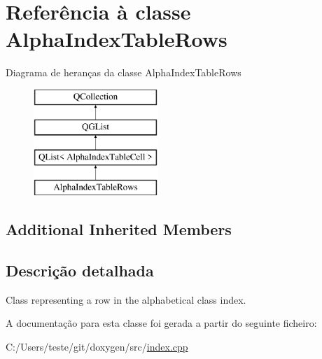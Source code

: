 \hypertarget{class_alpha_index_table_rows}{\section{Referência à classe Alpha\-Index\-Table\-Rows}
\label{class_alpha_index_table_rows}
}
Diagrama de heranças da classe Alpha\-Index\-Table\-Rows\begin{figure}[H]
\begin{center}
\leavevmode
\includegraphics[height=4.000000cm]{class_alpha_index_table_rows}
\end{center}
\end{figure}
\subsection*{Additional Inherited Members}


\subsection{Descrição detalhada}
Class representing a row in the alphabetical class index. 

A documentação para esta classe foi gerada a partir do seguinte ficheiro\-:\begin{DoxyCompactItemize}
\item 
C\-:/\-Users/teste/git/doxygen/src/\hyperlink{index_8cpp}{index.\-cpp}\end{DoxyCompactItemize}
